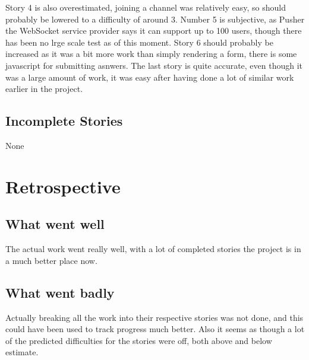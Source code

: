 \documentclass{article}
\begin{document}
Story 4 is also overestimated, joining a channel was relatively easy, so should probably be lowered to a difficulty of around 3. Number 5 is subjective, as Pusher the WebSocket service provider says it can support up to 100 users, though there has been no lrge scale test as of this moment. Story 6 should probably be increased as it was a bit more work than simply rendering a form, there is some javascript for submitting asnwers. The last story is quite accurate, even though it was a large amount of work, it was easy after having done a lot of similar work earlier in the project.
\subsection{Incomplete Stories}
None
\newpage

\section{Retrospective}
\subsection{What went well}
The actual work went really well, with a lot of completed stories the project is in a much better place now.
\subsection{What went badly}
Actually breaking all the work into their respective stories was not done, and this could have been used to track progress much better. Also it seems as though a lot of the predicted difficulties for the stories were off, both above and below estimate.
\end{document}
